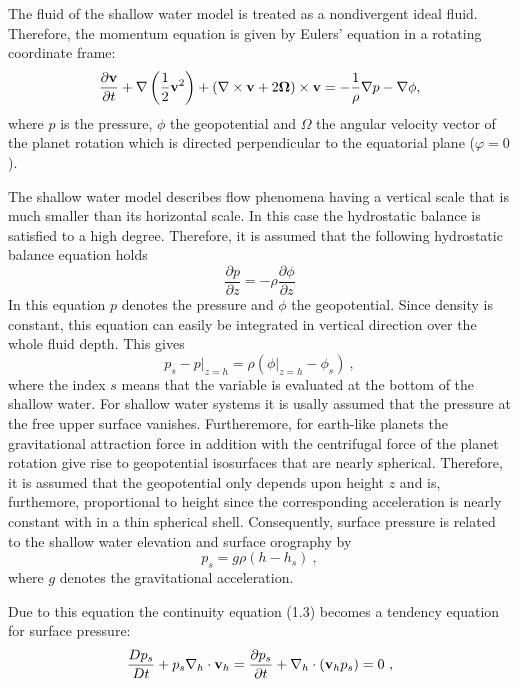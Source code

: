 The fluid of the shallow water model is treated as a nondivergent ideal fluid. Therefore,
the momentum equation is given by {\sc Euler}s' equation in a rotating coordinate frame:
\begin{equation}
\frac {\partial {\bf v}} {\partial t} + \nabla \left(\frac 1 2 {\bf v}^2 \right)
+ (\nabla \times {\bf v} + 2 \mbox{\boldmath $\Omega$}) \times {\bf v}
= - \frac 1 {\rho} \nabla p - \nabla \phi,
\end{equation}
where
$p$ is the pressure, $\phi$ the geopotential and  \mbox{\boldmath $\Omega$} the angular velocity vector of the planet rotation which is directed perpendicular to the
equatorial plane ($\varphi=0$).

The shallow water model describes 
flow phenomena having a vertical scale that is much smaller than its horizontal
scale. In this case the hydrostatic balance is satisfied to a high degree.
Therefore, it is assumed that the following hydrostatic balance equation holds
\begin{equation}
\frac {\partial p} {\partial z} = - \rho \frac {\partial \phi} {\partial z}
\end{equation}
In this equation $p$ denotes the pressure and
$\phi$ the geopotential.
Since density is constant, this equation can easily be
integrated in vertical direction over the whole fluid depth. This gives
\begin{equation}
p_s - \left . p \right |_{z=h} =  \rho ( \left . \phi \right |_{z=h} - \phi_s )~,
\end{equation}
where the index $s$ means that the variable is evaluated at the bottom of
the shallow water. 
For shallow water systems it is usally assumed that the pressure at the free upper surface vanishes. Furtheremore, for earth-like planets the gravitational attraction force in addition with the centrifugal force of the planet rotation give rise to  geopotential
isosurfaces that are nearly spherical. Therefore, it is assumed that the geopotential only
depends upon height $z$ and is, furthemore, proportional to height since the corresponding acceleration
is nearly constant with in a thin 
spherical shell. Consequently, surface pressure is related to the shallow water elevation
and surface orography by
\begin{equation}
p_s  =  g \rho (h - h_s)~,
\end{equation}
where $g$ denotes the gravitational acceleration.

Due to this equation the continuity equation (1.3) becomes a tendency equation for surface
pressure:
\begin{equation}
\frac {D p_s} {Dt}  + p_s \nabla_h \cdot {\bf v}_h  
= \frac {\partial p_s} {\partial t}  + \nabla_h \cdot ( {\bf v}_h p_s)=0 ~,
\end{equation}

